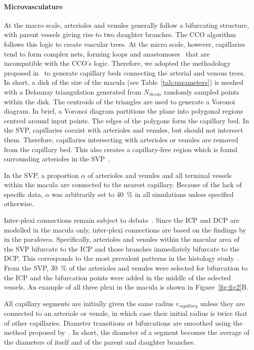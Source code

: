 \documentclass[11pt,]{article}
\begin{document}
\paragraph{Microvasculature}\label{sec:microvasculature}
At the macro scale, arterioles and venules generally follow a bifurcating
structure, with parent vessels giving rise to two daughter
branches. The CCO algorithm follows this logic to create vascular
trees.  At the micro scale, however, capillaries tend to form complex
nets, forming loops and anastomoses~\cite{An2020} that are
incompatible with the CCO’s logic.
Therefore, we adopted the methodology proposed in~\cite{Linninger2013} to generate capillary beds connecting
the arterial and venous trees.
In short, a disk of the size of the macula (see Table~\ref{tab:parameters}) is meshed with a Delaunay
triangulation generated from $N_{Seeds}$ randomly sampled points
within the disk.
The centroids of the triangles are used to generate a Voronoi diagram.
In brief, a Voronoi diagram partitions the plane into polygonal regions centred around input points. 
The edges of the polygons form the capillary bed.
In the SVP, capillaries coexist with arterioles and venules, but should not intersect them.
Therefore, capillaries intersecting with arterioles or venules are removed from the capillary bed.
This also creates a capillary-free region which is found surrounding arterioles in the SVP~\cite{An2020}.

In the SVP, a proportion $\alpha$ of arterioles and venules and all terminal vessels within the macula are connected to the nearest capillary. Because of the lack of specific data, $\alpha$ was arbitrarily set to \SI{40}{\percent} in all simulations unless specified otherwise.

Inter-plexi connections remain subject to debate~\cite{An2020,Chiaravalli2022,Campbell2017}.
Since the ICP and DCP are modelled in the macula only, inter-plexi connections are based on the findings by~\cite{An2020} in the parafovea.
Specifically, arterioles and venules within the macular area of the SVP bifurcate to the ICP and those branches immediately bifurcate to the DCP.
This corresponds to the most prevalent patterns in the histology study~\cite{An2020}.
From the SVP, \SI{30}{\percent} of the arterioles and venules were selected for bifurcation to the ICP and the bifurcation points were added in the middle of the selected vessels.
An example of all three plexi in the macula is shown in Figure~\ref{fig:fig2}B.

All capillary segments are initially given the same radius $r_{capillary}$ unless they are connected to an arteriole or venule, in which case their initial radius is twice that of other capillaries.
Diameter transitions at bifurcations are smoothed using the method proposed by~\cite{Linninger2013}.
In short, the diameter of a segment becomes the average of the diameters of itself and of the parent and daughter branches.
\end{document}
